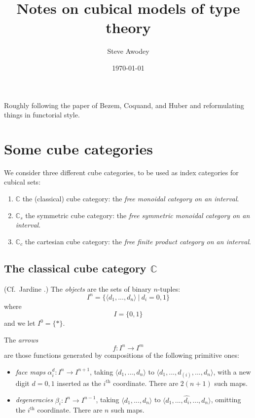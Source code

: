 \documentclass[11pt]{article}
\theoremstyle{remark}
\theoremstyle{definition}
\begin{document}

\title{Notes on cubical models of type theory}
\author{Steve Awodey}
\date{\today}

\maketitle

\noindent
Roughly following the paper of Bezem, Coquand, and Huber \cite{BCH} and reformulating things in functorial style.

\section{Some cube categories}

We consider three different cube categories, to be used as index categories for cubical sets:

\begin{enumerate}
\item $\mathbb{C}$ the (classical) cube category: the \emph{free monoidal category on an interval}.
\item $\mathbb{C}_s$ the symmetric cube category: the \emph{free symmetric monoidal category on an interval}.
\item $\mathbb{C}_c$ the cartesian cube category: the \emph{free finite product category on an interval}.
\end{enumerate}

\subsection{The classical cube category $\mathbb{C}$}

(Cf.\ Jardine \cite{Jardine2001,Jardine2002}.)
The \emph{objects} are the sets of binary $n$-tuples:
\[
I^n = \{ \langle d_1, ..., d_n\rangle\ \vert\ d_i = 0,1\}
\]
where 
\[
I = \{ 0, 1\}
\]
and we let $I^0 = \{*\}$.

The \emph{arrows} $$f : I^n \to I^m$$ are those functions generated by compositions of the following primitive ones:
\begin{itemize}
\item \emph{face maps} $\alpha^{d}_{i} : I^n \to I^{n+1}$, taking $\langle d_1, ..., d_n\rangle$ to $\langle d_1, ..., d_{(i)}, ..., d_n\rangle$, with a new digit $d = 0,1$ inserted as the $i^{\mathrm{th}}$ coordinate. There are $2(n+1)$ such maps.

\item \emph{degeneracies} $\beta_{i} : I^n \to I^{n-1}$, taking $\langle d_1, ..., d_n\rangle$ to $\langle d_1, ..., \hat{d_{i}}, ..., d_n\rangle$, omitting the $i^{\mathrm{th}}$ coordinate.  There are $n$ such maps.
\end{itemize}
\end{document}
